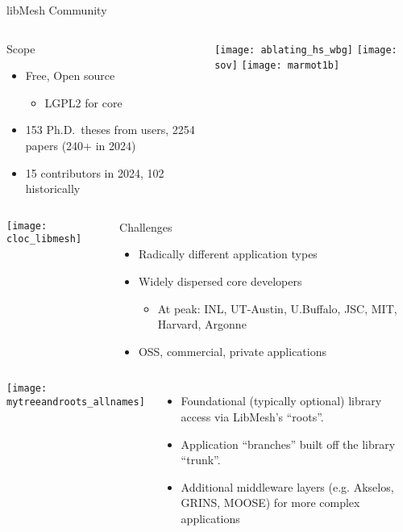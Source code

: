 \begin{frame}{libMesh Community}
\begin{columns}
\begin{block}{Scope}
\begin{itemize}
\item Free, Open source
\begin{itemize}
\item LGPL2 for core
\end{itemize}
\item 153 Ph.D.\ theses from users, 2254 papers (240+ in 2024)
\item 15 contributors in 2024, 102 historically
\end{itemize}
\end{block}

\texttt{[image: ablating\_hs\_wbg]}
\texttt{[image: sov]}
\texttt{[image: marmot1b]}
\end{columns}

\begin{columns}
\texttt{[image: cloc\_libmesh]}

\begin{block}{Challenges}
\begin{itemize}
\item Radically different application types
\item Widely dispersed core developers
\begin{itemize}
\item At peak: INL, UT-Austin, U.Buffalo, JSC, MIT, Harvard, Argonne
\end{itemize}
\item OSS, commercial, private applications
\end{itemize}
\end{block}
\end{columns}

\end{frame}


\begin{frame}[t]
  \begin{columns}
    \begin{center}
      \texttt{[image: mytreeandroots\_allnames]}
    \end{center}
    \begin{itemize}
      \item Foundational (typically optional) library access via LibMesh's ``roots''.
      \item Application ``branches'' built off the library ``trunk''.
      \item Additional middleware layers (e.g. Akselos, GRINS, MOOSE) for more complex applications
    \end{itemize}
  \end{columns}

\end{frame}
